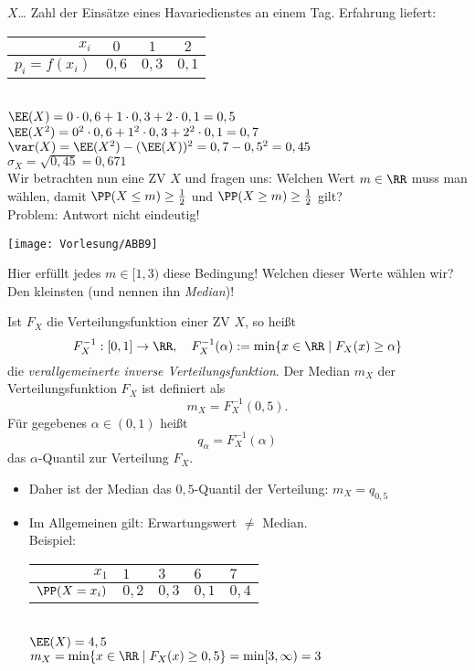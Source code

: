 \documentclass{scrreprt}
\begin{document}
 $X$… Zahl der Einsätze eines Havariedienstes an einem Tag. Erfahrung liefert: \\
\begin{tabular}{r | c c c}
$x_i$ & $0$ & $1$ & $2$\\\hline
$p_i=f(x_i)$ & $0,6$ & $0,3$ & $0,1$
\end{tabular}\medskip\\
$\EE(X)=0\cdot 0,6 + 1 \cdot 0,3 + 2 \cdot 0,1 = 0,5$\\
$\EE(X^2) = 0^2 \cdot 0,6  + 1^2 \cdot 0,3 + 2^2 \cdot 0,1 = 0,7$\\
$\var(X)=\EE(X^2) - (\EE(X))^2 = 0,7-0,5^2 = 0,45$\\
$\sigma_X= \sqrt{0,45}=0,671$\bigskip\\
Wir betrachten nun eine ZV $X$ und fragen uns: Welchen Wert $m\in \RR$ muss man wählen, damit $\PP(X\leq m)\geq \frac{1}{2}$ und $\PP(X\geq m) \geq \frac{1}{2}$ gilt?\\
Problem: Antwort nicht eindeutig!
\begin{center}
\texttt{[image: Vorlesung/ABB9]}
\end{center}
Hier erfüllt jedes $m\in [1,3)$ diese Bedingung! Welchen dieser Werte wählen wir? Den kleinsten (und nennen ihn \emph{Median})!

 Ist $F_X$ die Verteilungsfunktion einer ZV $X$, so heißt
$$F_X^{-1}: [0,1]\to \RR, \quad F_X^{-1}(\alpha):= \min\{x\in\RR\;|\; F_X(x) \geq \alpha \}$$
die \emph{verallgemeinerte inverse Verteilungsfunktion}. Der Median $m_X$ der Verteilungsfunktion $F_X$ ist definiert als
$$m_X = F_X^{-1}(0,5)\text{.}$$
Für gegebenes $\alpha \in (0,1)$ heißt
$$q_\alpha = F_X^{-1}(\alpha)$$
das $\alpha$-Quantil zur Verteilung $F_X$.

\begin{itemize}
\item Daher ist der Median das $0,5$-Quantil der Verteilung: $m_X=q_{0,5}$
\item Im Allgemeinen gilt: Erwartungswert $\not =$ Median.\\
Beispiel:\\
\begin{tabular}{r | l l l l}
$x_1$ & $1$ & $3$ & $6$ & $7$\\\hline
$\PP(X=x_i)$ & $0,2$ & $0,3$ & $0,1$ & $0,4$
\end{tabular}\\
$\EE(X)=4,5$\\
$m_X=\min\{x\in \RR \;|\; F_X(x) \geq 0,5\}= \min[3,\infty) = 3$
\end{itemize}
\end{document}
